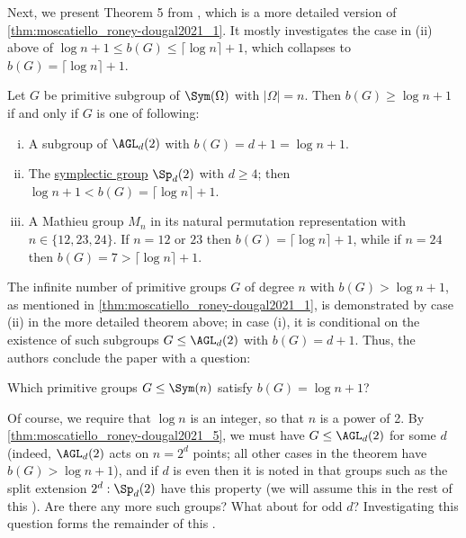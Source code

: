 Next, we present Theorem 5 from \cite{moscatiello_roney-dougal2021}, which is a more detailed version of \autoref{thm:moscatiello_roney-dougal2021_1}. It mostly investigates the case in (ii) above of $\log n + 1 \leq b(G) \leq \lceil\log n\rceil + 1$, which collapses to $b(G) = \lceil\log n\rceil + 1$.

\begin{theorem}\label{thm:moscatiello_roney-dougal2021_5}
    Let $G$ be primitive subgroup of $\Sym(\Omega)$ with $|\Omega| = n$. Then $b(G) \geq \log n + 1$ if and only if $G$ is one of following:
    \begin{enumerate}[(i)]
        \item A subgroup of $\AGL_d(2)$ with $b(G) = d + 1 = \log n + 1$.
        \item The \hyperref[def:symplectic_group]{symplectic group} $\Sp_d(2)$ with $d \geq 4$; then $\log n + 1 < b(G) = \lceil\log n\rceil + 1$. %
        \item A Mathieu group $M_n$ in its natural permutation representation with $n \in \{12,23,24\}$. If $n = 12$ or $23$ then $b(G) = \lceil\log n\rceil + 1$, while if $n = 24$ then $b(G) = 7 > \lceil\log n\rceil + 1$.
    \end{enumerate}
\end{theorem}

The infinite number of primitive groups $G$ of degree $n$ with $b(G) > \log n + 1$, as mentioned in \autoref{thm:moscatiello_roney-dougal2021_1}, is demonstrated by case (ii) in the more detailed theorem above; in case (i), it is conditional on the existence of such subgroups $G \leq \AGL_d(2)$ with $b(G) = d + 1$. Thus, the authors conclude the paper \cite{moscatiello_roney-dougal2021} with a question:

\begin{question}\label{qn:moscatiello_roney-dougal2021}
    Which primitive groups $G \leq \Sym(n)$ satisfy $b(G) = \log n + 1$?
\end{question}

Of course, we require that $\log n$ is an integer, so that $n$ is a power of 2. By \autoref{thm:moscatiello_roney-dougal2021_5}, we must have $G \leq \AGL_d(2)$ for some $d$ (indeed, $\AGL_d(2)$ acts on $n = 2^d$ points; all other cases in the theorem have $b(G) > \log n + 1$), and if $d$ is even then it is noted in \cite{moscatiello_roney-dougal2021} that groups such as the split extension $2^d : \Sp_d(2)$ have this property (we will assume this in the rest of this \thesis{}). Are there any more such groups? What about for odd $d$? Investigating this question forms the remainder of this \thesis{}.

